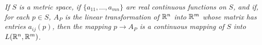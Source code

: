 \emph{If $S$ is a metric space, if $\{a_{11}, \dots, a_{mn}\}$ are real continuous functions on $S$,
and if, for each $p \in S$, $A_P$ is the linear transformation of ${\protect\mathbb R}^n$ into ${\protect\mathbb R}^m$ whose matrix has entries $a_{ij}(p)$, 
then the mapping $p \rightarrow A_P$ is a continuous mapping of $S$ into
$L({\protect\mathbb R}^n, {\protect\mathbb R}^m)$.}
